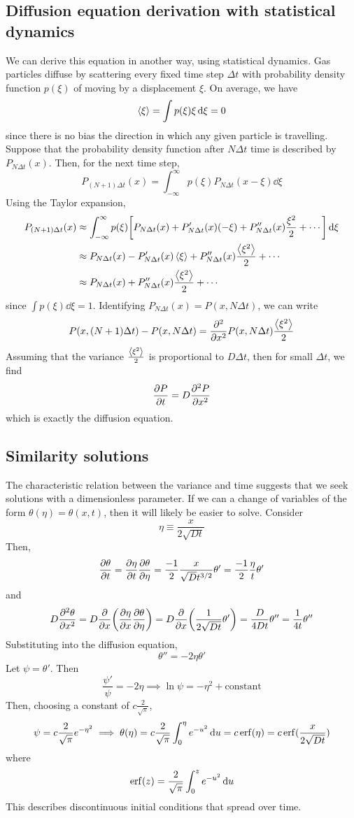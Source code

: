\subsection{Diffusion equation derivation with statistical dynamics}
We can derive this equation in another way, using statistical dynamics.
Gas particles diffuse by scattering every fixed time step \( \Delta t \) with probability density function \( p(\xi) \) of moving by a displacement \( \xi \).
On average, we have
\[
	\left\langle{\xi}\right\rangle = \int p(\xi) \xi \dd{\xi} = 0
\]
since there is no bias the direction in which any given particle is travelling.
Suppose that the probability density function after \( N\Delta t \) time is described by \( P_{N \Delta t}(x) \).
Then, for the next time step,
\[
	P_{(N+1)\Delta t}(x) = \int_{-\infty}^\infty p(\xi) P_{N \Delta t}(x - \xi) \dd{\xi}
\]
Using the Taylor expansion,
\begin{align*}
	P_{(N+1)\Delta t}(x) & \approx \int_{-\infty}^\infty p(\xi) \qty[P_{N \Delta t}(x) + P_{N \Delta t}'(x)(-\xi) + P_{N \Delta t}''(x)\frac{\xi^2}{2} + \cdots] \dd{\xi} \\
	                     & \approx P_{N \Delta t}(x) - P_{N \Delta t}'(x) \left\langle{\xi}\right\rangle + P_{N \Delta t}''(x) \frac{\left\langle{\xi^2}\right\rangle}{2} + \cdots                              \\
	                     & \approx P_{N \Delta t}(x) + P_{N \Delta t}''(x) \frac{\left\langle{\xi^2}\right\rangle}{2} + \cdots
\end{align*}
since \( \int p(\xi) \dd{\xi} = 1 \).
Identifying \( P_{N \Delta t}(x) = P(x, N\Delta t) \), we can write
\[
	P(x, (N+1)\Delta t) - P(x, N \Delta t) = \pdv[2]{x} P(x, N\Delta t) \frac{\left\langle{\xi^2}\right\rangle}{2}
\]
Assuming that the variance \( \frac{\left\langle{\xi^2}\right\rangle}{2} \) is proportional to \( D \Delta t \), then for small \( \Delta t \), we find
\[
	\pdv{P}{t} = D \pdv[2]{P}{x}
\]
which is exactly the diffusion equation.

\subsection{Similarity solutions}
The characteristic relation between the variance and time suggests that we seek solutions with a dimensionless parameter.
If we can a change of variables of the form \( \theta(\eta) = \theta(x,t) \), then it will likely be easier to solve.
Consider
\[
	\eta \equiv \frac{x}{2\sqrt{Dt}}
\]
Then,
\[
	\pdv{\theta}{t} = \pdv{\eta}{t} \pdv{\theta}{\eta} = \frac{-1}{2} \frac{x}{\sqrt{D} t^{3/2}} \theta' = \frac{-1}{2} \frac{\eta}{t} \theta'
\]
and
\[
	D \pdv[2]{\theta}{x} = D \pdv{x} \qty(\pdv{\eta}{x} \pdv{\theta}{\eta}) = D \pdv{x} \qty(\frac{1}{2\sqrt{Dt}} \theta') = \frac{D}{4Dt} \theta'' = \frac{1}{4t} \theta''
\]
Substituting into the diffusion equation,
\[
	\theta'' = -2 \eta \theta'
\]
Let \( \psi = \theta' \).
Then
\[
	\frac{\psi'}{\psi} = -2\eta \implies \ln \psi = -\eta^2 + \text{constant}
\]
Then, choosing a constant of \( c\frac{2}{\sqrt{\pi}} \),
\[
	\psi = c\frac{2}{\sqrt{\pi}} e^{-\eta^2} \implies \theta(\eta) = c\frac{2}{\sqrt{\pi}} \int_0^\eta e^{-u^2} \dd{u} = c \erf(\eta) = c \erf(\frac{x}{2\sqrt{Dt}})
\]
where
\[
	\erf(z) = \frac{2}{\sqrt{\pi}} \int_0^z e^{-u^2} \dd{u}
\]
This describes discontinuous initial conditions that spread over time.

